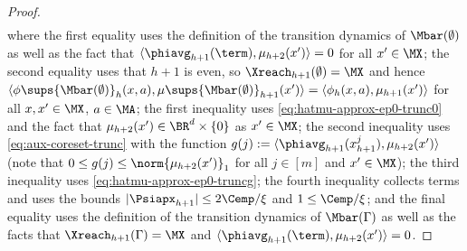 \documentclass[11pt, oneside]{article}
\theoremstyle{plain}
\theoremstyle{definition}
\numberwithin{theorem}{section}
\renewcommand{\^}[1]{^{(#1)}}
\begin{document}
\begin{proof}
\begin{align}
  \end{align}
  where the first equality uses the definition of the transition dynamics of $\Mbar(\emptyset)$ as well as the fact that $\langle \phiavg_{h+1}(\term), \mu_{h+2}(x')\rangle = 0$ for all $x'\in\MX$; the second equality uses that $h+1$ is even, so $\Xreach_{h+1}(\emptyset) = \MX$ and hence $\langle \phi\sups{\Mbar(\emptyset)}_h(x,a), \mu\sups{\Mbar(\emptyset)}_{h+1}(x')\rangle = \langle \phi_h(x,a), \mu_{h+1}(x')\rangle$ for all $x,x'\in\MX$, $a \in \MA$; the first inequality uses \cref{eq:hatmu-approx-ep0-trunc0} and the fact that $\mu_{h+2}(x') \in \BR^d \times \{ 0 \}$ as $x' \in \MX$; the second inequality uses \cref{eq:aux-coreset-trunc} with the function $g(j) := \langle \phiavg_{h+1}(x_{h+1}^j),\mu_{h+2}(x')\rangle$ (note that $0 \leq g(j) \leq \norm{\mu_{h+2}(x')}_1$ for all $j \in [m]$ and $x' \in \MX$); the third inequality uses \cref{eq:hatmu-approx-ep0-truncg}; the fourth inequality collects terms and uses the bounds $|\Psiapx_{h+1}| \leq 2\Cemp/\xi$ and $1 \leq \Cemp/\xi$; and the final equality uses the definition of the transition dynamics of $\Mbar(\Gamma)$ as well as the facts that $\Xreach_{h+1}(\Gamma)=\MX$ and $\langle\phiavg_{h+1}(\term),\mu_{h+2}(x')\rangle=0$.



\end{proof}
\end{document}
